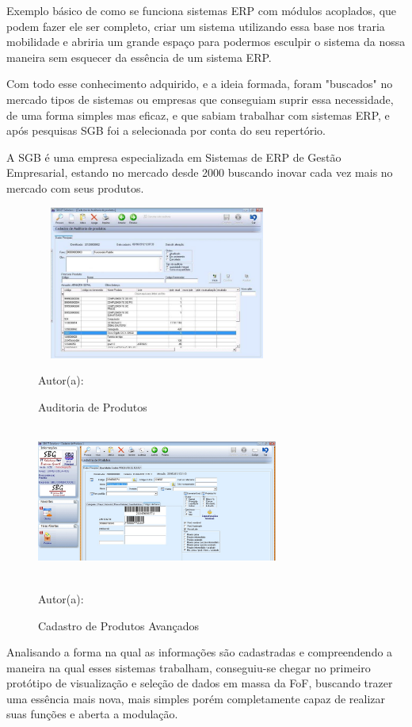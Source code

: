 Exemplo básico de como se funciona sistemas ERP com módulos acoplados, que podem fazer ele ser completo, criar um sistema utilizando essa base nos traria mobilidade e abriria um grande espaço para podermos esculpir o sistema da nossa maneira sem esquecer da essência de um sistema ERP.

Com todo esse conhecimento adquirido, e a ideia formada, foram "buscados" no mercado tipos de sistemas ou empresas que conseguiam suprir essa necessidade, de uma forma simples mas eficaz, e que sabiam trabalhar com sistemas ERP, e após pesquisas SGB foi a selecionada por conta do seu repertório. 

A SGB é uma empresa especializada em Sistemas de ERP de Gestão Empresarial, estando no mercado desde 2000 buscando inovar cada vez mais no mercado com seus produtos.

\begin{figure}[!h]
	\centering
	\caption{Auditoria de Produtos}
	\includegraphics[width=300px, height=190px]{./images/SGB1.jpg}
	\par{Autor(a): \cite{sbg}}
\end{figure}

\begin{figure}[!h]
	\centering
	\caption{Cadastro de Produtos Avançados}
	\includegraphics[width=300px, height=190px]{./images/SBG2.jpg}
	\par{Autor(a): \cite{sbg-1}}
\end{figure}
\newpage

Analisando a forma na qual as informações são cadastradas e compreendendo a maneira na qual esses sistemas trabalham, conseguiu-se chegar no primeiro protótipo de visualização e seleção de dados em massa da FoF, buscando trazer uma essência mais nova, mais simples porém completamente capaz de realizar suas funções e aberta a modulação.

